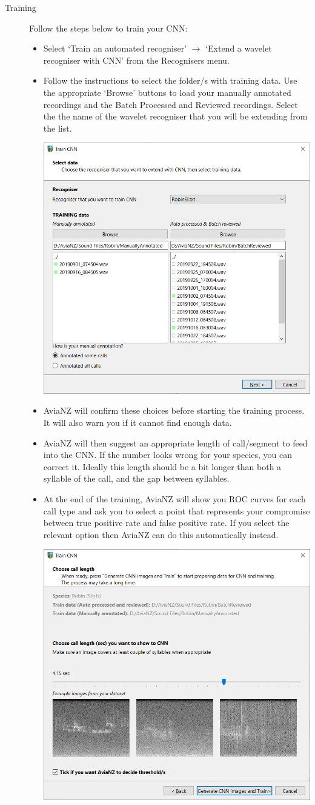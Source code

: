 \documentclass{article}
\begin{document}
\begin{description}
\item[Training] Follow the steps below to train your CNN:
\begin{itemize}
\item Select `Train an automated recogniser' $\rightarrow$ `Extend a wavelet recogniser with CNN' from the Recognisers menu. 
\item Follow the instructions to select the folder/s with training data. Use the appropriate `Browse' buttons to load your manually annotated recordings and the Batch Processed and Reviewed recordings. Select the the name of the wavelet recogniser that you will be extending from the list. 

\begin{center}
    \includegraphics[width=.4\textwidth]{Figures/CNNpage1}
\end{center}

\item AviaNZ will confirm these choices before starting the training process. It will also warn you if it cannot find enough data. 
\item AviaNZ will then suggest an appropriate length of call/segment to feed into the CNN. If the number looks wrong for your species, you can correct it. Ideally this length should be a bit longer than both a syllable of the call, and the gap between syllables. 
\item At the end of the training, AviaNZ will show you ROC curves for each call type and ask you to select a point that represents your compromise between true positive rate and false positive rate. If you select the relevant option then AviaNZ can do this automatically instead. 

\begin{center}
    \includegraphics[width=.4\textwidth]{Figures/CNNpage2}
\end{center}


\end{itemize}
\end{description}
\end{document}
